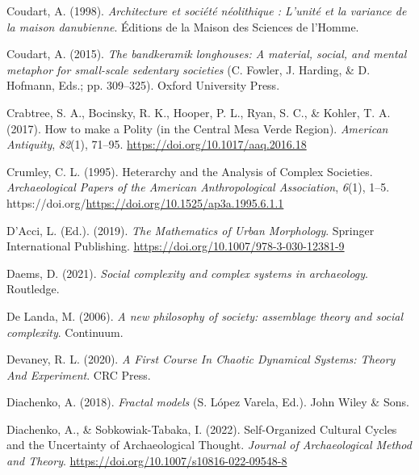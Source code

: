 \documentclass[
  12pt,
]{book}
\newlength{\cslhangindent}
\newlength{\cslentryspacingunit} %
\newenvironment{CSLReferences}[2] %
 {%
  \setlength{\parindent}{0pt}
  \ifodd #1
  \let\oldpar\par
  \def\par{\hangindent=\cslhangindent\oldpar}
  \fi
  \setlength{\parskip}{#2\cslentryspacingunit}
 }%
 {}
\begin{document}
\begin{CSLReferences}{1}{0}
\leavevmode{}%
Coudart, A. (1998). \emph{Architecture et société néolithique : L'unité et la variance de la maison danubienne}. Éditions de la Maison des Sciences de l'Homme.

\leavevmode{}%
Coudart, A. (2015). \emph{The bandkeramik longhouses: A material, social, and mental metaphor for small-scale sedentary societies} (C. Fowler, J. Harding, \& D. Hofmann, Eds.; pp. 309--325). Oxford University Press.

\leavevmode{}%
Crabtree, S. A., Bocinsky, R. K., Hooper, P. L., Ryan, S. C., \& Kohler, T. A. (2017). How to make a Polity (in the Central Mesa Verde Region). \emph{American Antiquity}, \emph{82}(1), 71--95. \url{https://doi.org/10.1017/aaq.2016.18}

\leavevmode{}%
Crumley, C. L. (1995). Heterarchy and the Analysis of Complex Societies. \emph{Archaeological Papers of the American Anthropological Association}, \emph{6}(1), 1--5. https://doi.org/\url{https://doi.org/10.1525/ap3a.1995.6.1.1}

\leavevmode{}%
D'Acci, L. (Ed.). (2019). \emph{The Mathematics of Urban Morphology}. Springer International Publishing. \url{https://doi.org/10.1007/978-3-030-12381-9}

\leavevmode{}%
Daems, D. (2021). \emph{Social complexity and complex systems in archaeology}. Routledge.

\leavevmode{}%
De Landa, M. (2006). \emph{A new philosophy of society: assemblage theory and social complexity}. Continuum.

\leavevmode{}%
Devaney, R. L. (2020). \emph{A First Course In Chaotic Dynamical Systems: Theory And Experiment}. CRC Press.

\leavevmode{}%
Diachenko, A. (2018). \emph{Fractal models} (S. López Varela, Ed.). John Wiley \& Sons.

\leavevmode{}%
Diachenko, A., \& Sobkowiak-Tabaka, I. (2022). Self-{Organized Cultural Cycles} and the {Uncertainty} of {Archaeological Thought}. \emph{Journal of Archaeological Method and Theory}. \url{https://doi.org/10.1007/s10816-022-09548-8}


\end{CSLReferences}
\end{document}
